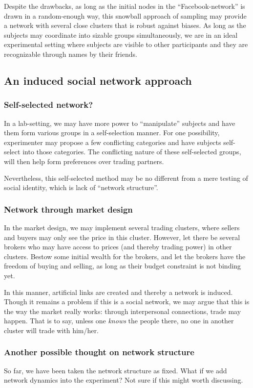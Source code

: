 \documentclass{article}
\begin{document}
Despite the drawbacks, as long as the initial nodes in the ``Facebook-network''
is drawn in a random-enough way, this snowball approach of sampling may provide
a network with several close clusters that is robust against biases.
As long as the subjects may coordinate into sizable groups simultaneously, we
are in an ideal experimental setting where subjects are visible to other
participants and they are recognizable through names by their friends.

\subsection{An induced social network approach}

\subsubsection{Self-selected network?}
In a lab-setting, we may have more power to ``manipulate'' subjects and have
them form various groups in a self-selection manner. For one possibility,
experimenter may propose a few conflicting categories and have subjects
self-select into those categories. The conflicting nature of these self-selected
groups, will then help form preferences over trading partners.

Nevertheless, this self-selected method may be no different from a mere testing
of social identity, which is lack of ``network structure''.

\subsubsection{Network through market design}

In the market design, we may implement several trading clusters, where sellers
and buyers may only see the price in this cluster. However, let there be several
brokers who may have access to prices (and thereby trading power) in other
clusters. Bestow some initial wealth for the brokers, and let the brokers have
the freedom of buying and selling, as long as their budget constraint is not
binding yet.

In this manner, artificial links are created and thereby a network is induced.
Though it remains a problem if this is a social network, we may argue that this
is the way the market really works: through interpersonal connections, trade may
happen. That is to say, unless one \textit{knows} the people there, no one in
another cluster will trade with him/her.

\subsubsection{Another possible thought on network structure}

So far, we have been taken the network structure as fixed. What if we add
network dynamics into the experiment? Not sure if this might worth discussing.







\end{document}
